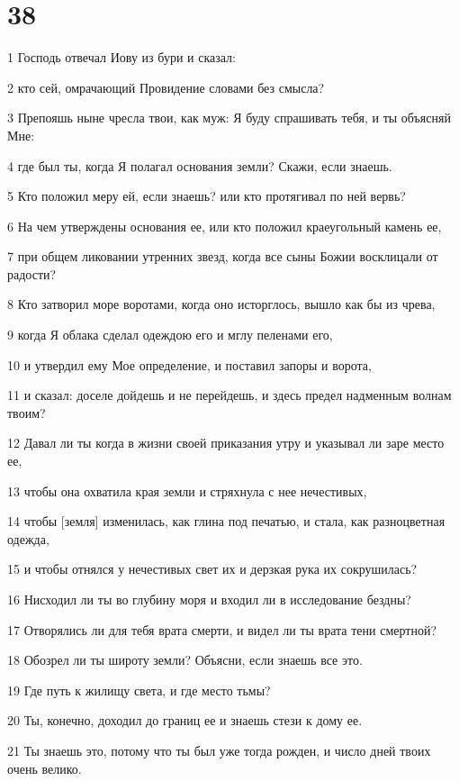 \chapter{38}

\par 1 Господь отвечал Иову из бури и сказал:
\par 2 кто сей, омрачающий Провидение словами без смысла?
\par 3 Препояшь ныне чресла твои, как муж: Я буду спрашивать тебя, и ты объясняй Мне:
\par 4 где был ты, когда Я полагал основания земли? Скажи, если знаешь.
\par 5 Кто положил меру ей, если знаешь? или кто протягивал по ней вервь?
\par 6 На чем утверждены основания ее, или кто положил краеугольный камень ее,
\par 7 при общем ликовании утренних звезд, когда все сыны Божии восклицали от радости?
\par 8 Кто затворил море воротами, когда оно исторглось, вышло как бы из чрева,
\par 9 когда Я облака сделал одеждою его и мглу пеленами его,
\par 10 и утвердил ему Мое определение, и поставил запоры и ворота,
\par 11 и сказал: доселе дойдешь и не перейдешь, и здесь предел надменным волнам твоим?
\par 12 Давал ли ты когда в жизни своей приказания утру и указывал ли заре место ее,
\par 13 чтобы она охватила края земли и стряхнула с нее нечестивых,
\par 14 чтобы [земля] изменилась, как глина под печатью, и стала, как разноцветная одежда,
\par 15 и чтобы отнялся у нечестивых свет их и дерзкая рука их сокрушилась?
\par 16 Нисходил ли ты во глубину моря и входил ли в исследование бездны?
\par 17 Отворялись ли для тебя врата смерти, и видел ли ты врата тени смертной?
\par 18 Обозрел ли ты широту земли? Объясни, если знаешь все это.
\par 19 Где путь к жилищу света, и где место тьмы?
\par 20 Ты, конечно, доходил до границ ее и знаешь стези к дому ее.
\par 21 Ты знаешь это, потому что ты был уже тогда рожден, и число дней твоих очень велико.
